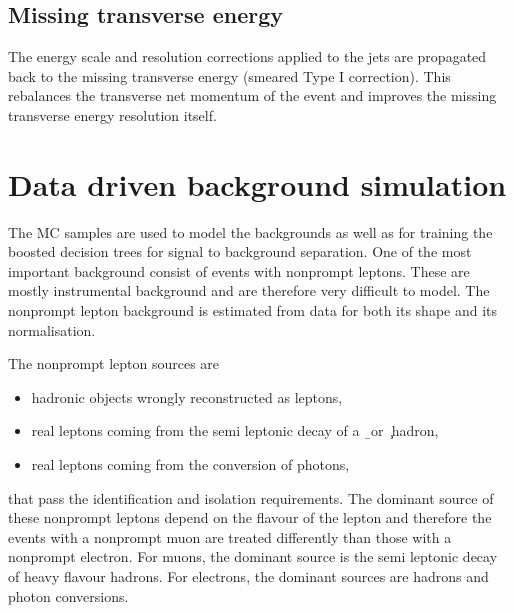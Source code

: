 

\subsection*{Missing transverse energy}
The energy scale and resolution corrections applied to the jets are propagated back to the  missing transverse energy (smeared Type I correction). This rebalances the transverse net momentum of the event and improves the missing transverse energy resolution itself.



\section{Data driven background simulation}
\label{sec:NPL}

The MC samples are used to model the backgrounds as well as for training the boosted decision trees
for signal to background separation. One of the most important background consist of events with nonprompt leptons. These are mostly instrumental background and are therefore very difficult to model. The nonprompt lepton background is estimated from data for both its shape and its normalisation. 

The nonprompt lepton sources are 
\begin{itemize}
	\item hadronic objects wrongly reconstructed as leptons, 
	\item real leptons coming from the semi leptonic decay of a \b\ or \c\ hadron,
	\item real leptons coming from the conversion of photons, 
\end{itemize}
that pass the identification and isolation requirements. The dominant source of these nonprompt leptons depend on the flavour of the lepton and therefore the events with a nonprompt muon are treated differently than those with a nonprompt electron. For muons, the dominant source is the semi leptonic decay of heavy flavour hadrons. For electrons, the dominant sources are hadrons and photon conversions. 

